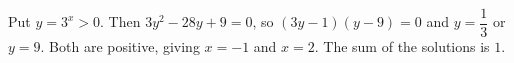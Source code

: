 Put $y=3^x>0$. Then $3y^2-28y+9=0$, so $(3y-1)(y-9)=0$ and $y=\dfrac{1}{3}$ or $y=9$. Both are positive, giving $x=-1$ and $x=2$. The sum of the solutions is $\boxed{1}$.
